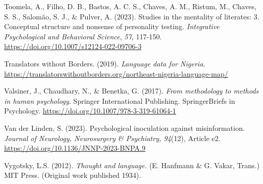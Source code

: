 \documentclass[authordate, reflection, issue]{jote-new-article}
\begin{document}
	Toomela, A., Filho, D. B., Bastos, A. C. S., Chaves, A. M., Ristum, M., Chaves, S. S., Salomão, S. J., \& Pulver, A. (2023). Studies in the mentality of literates: 3. Conceptual structure and nonsense of personality testing. \emph{Integrative Psychological and Behavioral Science}, \emph{57}, 117-150. \url{https://doi.org/10.1007/s12124-022-09706-3}



	Translators without Borders. (2019). \emph{Language data for Nigeria}. \url{https://translatorswithoutborders.org/northeast-nigeria-language-map/}



	Valsiner, J., Chaudhary, N., \& Benetka, G. (2017). \emph{From methodology to methods in human psychology}. Springer International Publishing. SpringerBriefs in Psychology. \url{https://doi.org/10.1007/978-3-319-61064-1}



	Van der Linden, S. (2023). Psychological inoculation against misinformation. \emph{Journal of Neurology, Neurosurgery \& Psychiatry, 94}(12), Article e2. \url{https://doi.org/10.1136/JNNP-2023-BNPA.9}



	Vygotsky, L.S. (2012). \emph{Thought and language. }(E. Hanfmann \& G. Vakar, Trans.) MIT Press. (Original work published 1934).
\end{document}
